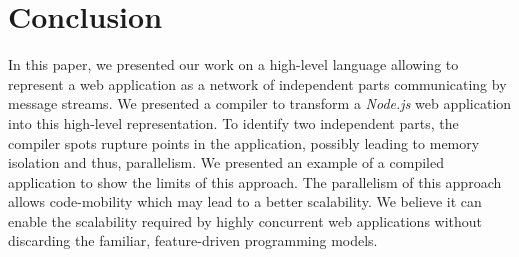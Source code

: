 \section{Conclusion} \label{section:conclusion}

In this paper, we presented our work on a high-level language allowing to represent a web application as a network of independent parts communicating by message streams.
We presented a compiler to transform a \textit{Node.js} web application into this high-level representation.
To identify two independent parts, the compiler spots rupture points in the application, possibly leading to memory isolation and thus, parallelism.
We presented an example of a compiled application to show the limits of this approach.
The parallelism of this approach allows code-mobility which may lead to a better scalability.
We believe it can enable the scalability required by highly concurrent web applications without discarding the familiar, feature-driven programming models.